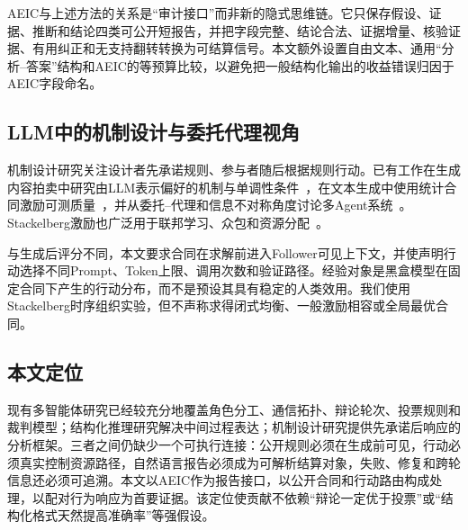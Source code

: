 AEIC与上述方法的关系是“审计接口”而非新的隐式思维链。它只保存假设、证据、推断和结论四类可公开短报告，并把字段完整、结论合法、证据增量、核验证据、有用纠正和无支持翻转转换为可结算信号。本文额外设置自由文本、通用“分析--答案”结构和AEIC的等预算比较，以避免把一般结构化输出的收益错误归因于AEIC字段命名。

\subsection{LLM中的机制设计与委托代理视角}
机制设计研究关注设计者先承诺规则、参与者随后根据规则行动。已有工作在生成内容拍卖中研究由LLM表示偏好的机制与单调性条件~\cite{duetting2023mechanism}，在文本生成中使用统计合同激励可测质量~\cite{saig2024incentivizing}，并从委托--代理和信息不对称角度讨论多Agent系统~\cite{rauba2025principal,kaltenpoth2025agency}。Stackelberg激励也广泛用于联邦学习、众包和资源分配~\cite{fu2024stackelberg,guo2023incentive,wang2024incentive}。

与生成后评分不同，本文要求合同在求解前进入Follower可见上下文，并使声明行动选择不同Prompt、Token上限、调用次数和验证路径。经验对象是黑盒模型在固定合同下产生的行动分布，而不是预设其具有稳定的人类效用。我们使用Stackelberg时序组织实验，但不声称求得闭式均衡、一般激励相容或全局最优合同。

\subsection{本文定位}
现有多智能体研究已经较充分地覆盖角色分工、通信拓扑、辩论轮次、投票规则和裁判模型；结构化推理研究解决中间过程表达；机制设计研究提供先承诺后响应的分析框架。三者之间仍缺少一个可执行连接：公开规则必须在生成前可见，行动必须真实控制资源路径，自然语言报告必须成为可解析结算对象，失败、修复和跨轮信息还必须可追溯。本文以AEIC作为报告接口，以公开合同和行动路由构成处理，以配对行为响应为首要证据。该定位使贡献不依赖“辩论一定优于投票”或“结构化格式天然提高准确率”等强假设。
